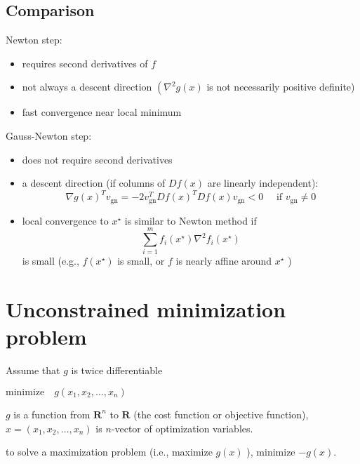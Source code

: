 \subsection{Comparison}

Newton step:
\begin{itemize}
    \item requires second derivatives of $ f $
    \item not always a descent direction $ \left(\nabla^{2} g(x)\right. $ is not necessarily positive definite)
    \item fast convergence near local minimum
\end{itemize}


Gauss-Newton step:
\begin{itemize}
    \item does not require second derivatives
    \item a descent direction (if columns of $ D f(x) $ are linearly independent):
    \begin{equation}
    \nabla g(x)^{T} v_{\mathrm{gn}}=-2 v_{\mathrm{gn}}^{T} D f(x)^{T} D f(x) v_{\mathrm{gn}}<0 \quad \text { if } v_{\mathrm{gn}} \neq 0
    \end{equation}
    \item local convergence to $ x^{\star} $ is similar to Newton method if
\begin{equation}
\sum_{i=1}^{m} f_{i}\left(x^{\star}\right) \nabla^{2} f_{i}\left(x^{\star}\right)
\end{equation}
is small (e.g., $ f\left(x^{\star}\right) $ is small, or $ f $ is nearly affine around $ x^{\star} $ )
\end{itemize}


\section{Unconstrained minimization problem}

\begin{problem}
    Assume that $ g $ is twice differentiable

    $\text{minimize} \quad g\left(x_{1}, x_{2}, \ldots, x_{n}\right) $

    $ g $ is a function from $ \mathbf{R}^{n} $ to $ \mathbf{R} $ (the cost function or objective function), $ x=\left(x_{1}, x_{2}, \ldots, x_{n}\right) $ is $ n $-vector of optimization variables.
\end{problem}

to solve a maximization problem (i.e., maximize $ g(x) $ ), minimize $ -g(x) $.

